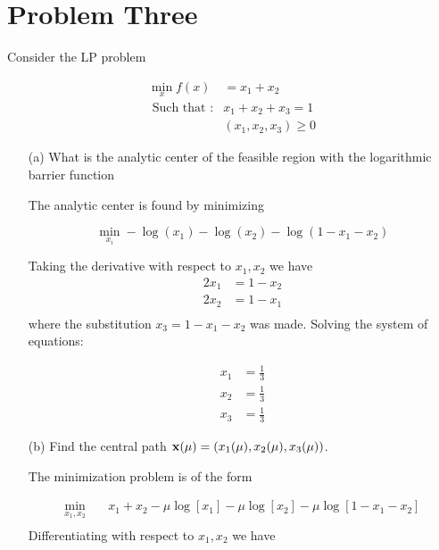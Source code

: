 \documentclass{article} %
\newcommand\x{{\bf x}}
\begin{document}
\section*{Problem Three} Consider the LP problem 

\begin{equation*}
\begin{aligned}
\min_x  f(x) &= x_1 + x_2 \\ 
\mbox{ Such that }:&  x_1 + x_2 + x_3 = 1 \\ 
&(x_1, x_2, x_3) \geq 0
\end{aligned}
\end{equation*}

\begin{itemize}
\item[(a)] What is the analytic center of the feasible region with the logarithmic barrier function


The analytic center is found by minimizing 

\[
\min_{x_i} -\log(x_1) - \log(x_2) - \log(1 - x_1  - x_2 )
\]

Taking the derivative with respect to $x_1, x_2$ we have
\begin{equation*}
\begin{aligned}
2x_1 &= 1 - x_2 \\ 
2x_2 &= 1 - x_1 \\ 
\end{aligned}
\end{equation*}
where the substitution $x_3 = 1 - x_1 - x_2$ was made.
Solving the system of equations:

\begin{equation*}
\begin{aligned}
x_1 &= \frac{1}{3} \\ 
x_2 &= \frac{1}{3}\\ 
x_3 &= \frac{1}{3} 
\end{aligned}
\end{equation*}


\item[(b)] Find the central path $\x(\mu) = (x_1(\mu), x_2(\mu), x_3(\mu))$. 


The minimization problem is of the form 

\begin{equation*}
\begin{aligned}
\min_{x_1, x_2} \quad & x_1 + x_2 - \mu \log[x_1] - \mu \log[x_2] -  \mu \log[1 - x_1 - x_2] \\ 
\end{aligned}
\end{equation*}
Differentiating with respect to $x_1, x_2$ we have 


\end{itemize}
\end{document}
